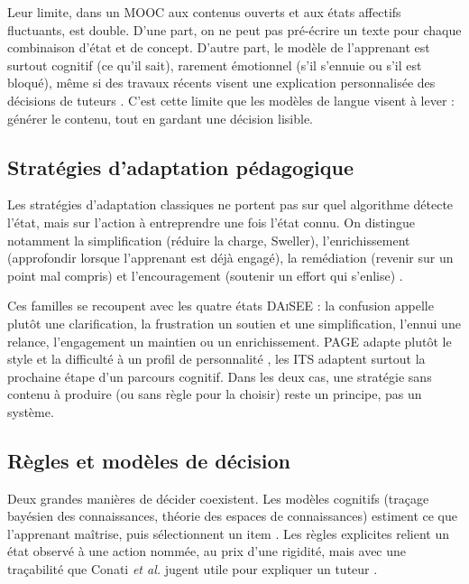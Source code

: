 Leur limite, dans un MOOC aux contenus ouverts et aux états affectifs
fluctuants, est double. D'une part, on ne peut pas pré-écrire un texte pour
chaque combinaison d'état et de concept. D'autre part, le modèle de
l'apprenant est surtout cognitif (ce qu'il sait), rarement émotionnel (s'il
s'ennuie ou s'il est bloqué), même si des travaux récents visent une
explication personnalisée des décisions de tuteurs \cite{conati2021toward}.
C'est cette limite que les modèles de langue visent à lever : générer le
contenu, tout en gardant une décision lisible.

\subsection{Stratégies d'adaptation pédagogique}

Les stratégies d'adaptation classiques ne portent pas sur quel
algorithme détecte l'état, mais sur l'action à entreprendre une fois
l'état connu. On distingue notamment la simplification (réduire
la charge, Sweller), l'enrichissement (approfondir lorsque
l'apprenant est déjà engagé), la remédiation (revenir sur un
point mal compris) et l'encouragement (soutenir un effort qui
s'enlise) \cite{sweller1988cognitive,vanlehn2011relative}.

Ces familles se recoupent avec les quatre états \textsc{DAiSEE} : la
confusion appelle plutôt une clarification, la frustration un soutien et
une simplification, l'ennui une relance, l'engagement un maintien ou un
enrichissement. PAGE adapte plutôt le style et la
difficulté à un profil de personnalité \cite{hu2025page}, les ITS
adaptent surtout la prochaine étape d'un parcours cognitif. Dans
les deux cas, une stratégie sans contenu à produire (ou sans règle pour
la choisir) reste un principe, pas un système.

\subsection{Règles et modèles de décision}

Deux grandes manières de décider coexistent. Les modèles
cognitifs (traçage bayésien des connaissances, théorie des espaces de
connaissances) estiment ce que l'apprenant maîtrise, puis sélectionnent
un item \cite{vanlehn2011relative}. Les règles explicites
relient un état observé à une action nommée, au prix d'une rigidité, mais
avec une traçabilité que Conati \emph{et al.} jugent utile pour expliquer
un tuteur \cite{conati2021toward}.

